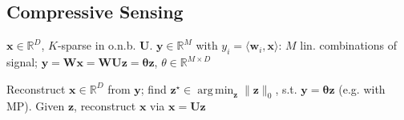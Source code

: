 \documentclass[a4paper, 11pt, landscape]{article}
\DeclareMathOperator*{\argmin}{arg\,min}
\begin{document}
\begin{multicols*}{3}
\subsection{Compressive Sensing}
\begin{compactitem}
  \item $\mathbf{x} \in \mathbb{R}^D$, $K$-sparse in o.n.b. $\mathbf{U}$. $\mathbf{y} \in \mathbb{R}^M$ with $y_i = \langle \mathbf{w}_i, \mathbf{x}\rangle $: $M$ lin. combinations of signal; $\mathbf{y} = \mathbf{Wx} = \mathbf{WUz} = \mathbf{\theta z}$, $\theta \in \mathbb{R}^{M \times D}$
  \item Reconstruct $\mathbf{x} \in \mathbb{R}^D$ from $\mathbf{y}$; find $\mathbf{z}^\star \in \argmin_{\mathbf{z}}\|\mathbf{z}\|_0$, s.t. $\mathbf{y} = \mathbf{\theta z}$ (e.g. with MP). Given $\mathbf{z}$, reconstruct $\mathbf{x}$ via $\mathbf{x} = \mathbf{Uz}$
\end{compactitem}


\end{multicols*}
\end{document}
